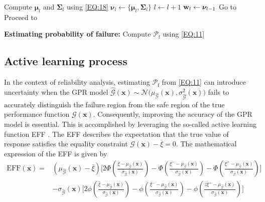 \documentclass[preprint,3p]{elsarticle}
\begin{document}
\begin{linenumbers}
\begin{algorithm}[t]
\begin{algorithmic}[1]
		\State Compute $\boldsymbol{\mu}_{l}$ and $\boldsymbol{\Sigma}_{l}$ using \cref{EQ:18}
		\State $\boldsymbol{\nu}_{l}\gets\{\boldsymbol{\mu}_{l},\boldsymbol{\Sigma}_{l}\}$
		\State $l \gets l+1$
		\State ${\bf w}_l \gets \boldsymbol{\nu}_{l-1}$
		\State Go to 
		\Else
		\State Proceed to 
		\EndIf
		
		\State \textbf{Estimating probability of failure:} 
		\State Compute $\mathcal{P}_\text{f}$ using \cref{EQ:11} \label{Algo1-21}
	\end{algorithmic}
\end{algorithm}

\subsection{Active learning process }\label{SUBSEC:24}
In the context of reliability analysis, estimating $\mathcal{P}_\mathrm f$ from \cref{EQ:11} can introduce uncertainty when the GPR model $\widehat{\mathcal{G}}(\textbf{x})\sim\mathcal{N}\bigl(\mu_{\widehat{\mathcal{G}}}(\textbf{x}),\sigma_{\widehat{\mathcal{G}}}^2(\textbf{x})\bigr)$ fails to accurately distinguish the failure region from the safe region of the true performance function $\mathcal{G}(\textbf{x})$.
Consequently, improving the accuracy of the GPR model is essential.
This is accomplished by leveraging the so-called active learning function EFF \cite{Bichon2011}. %
The EFF describes the expectation that the true value of response satisfies the equality constraint $\mathcal{G}(\textbf{x})-\bar\xi=0$. The mathematical expression of the EFF is given by \cite{Bichon2011}
\begin{equation}
    \begin{aligned}
        \text{EFF}(\textbf{x})= &
        \left(\mu_{\widehat{\mathcal{G}}}(\textbf{x})-\bar\xi\right)\Bigg[2\Phi\left(\frac{\bar\xi-\mu_{\widehat{\mathcal{G}}}(\textbf{x})}{\sigma_{\widehat{\mathcal{G}}}(\textbf{x})}\right)-\Phi\left(\frac{\xi^{-}-\mu_{\widehat{\mathcal{G}}}(\textbf{x})}{\sigma_{\widehat{\mathcal{G}}}(\textbf{x})}\right)
        -\Phi\left(\frac{\xi^{+}-\mu_{\widehat{\mathcal{G}}}(\textbf{x})}{\sigma_{\widehat{\mathcal{G}}}(\textbf{x})}\right)\Bigg]\\
        &-\sigma_{\widehat{\mathcal{G}}}(\textbf{x})\Bigg[2\phi\left(\frac{\bar\xi-\mu_{\widehat{\mathcal{G}}}(\textbf{x})}{\sigma_{\widehat{\mathcal{G}}}(\textbf{x})}\right)-\phi\left(\frac{\xi^{-}-\mu_{\widehat{\mathcal{G}}}(\textbf{x})}{\sigma_{\widehat{\mathcal{G}}}(\textbf{x})}\right)-\phi\left(\frac{z\xi^{+}-\mu_{\widehat{\mathcal{G}}}(\textbf{x})}{\sigma_{\widehat{\mathcal{G}}}(\textbf{x})}\right)\Bigg]\\

\end{aligned}
\end{equation}
\end{linenumbers}
\end{document}
